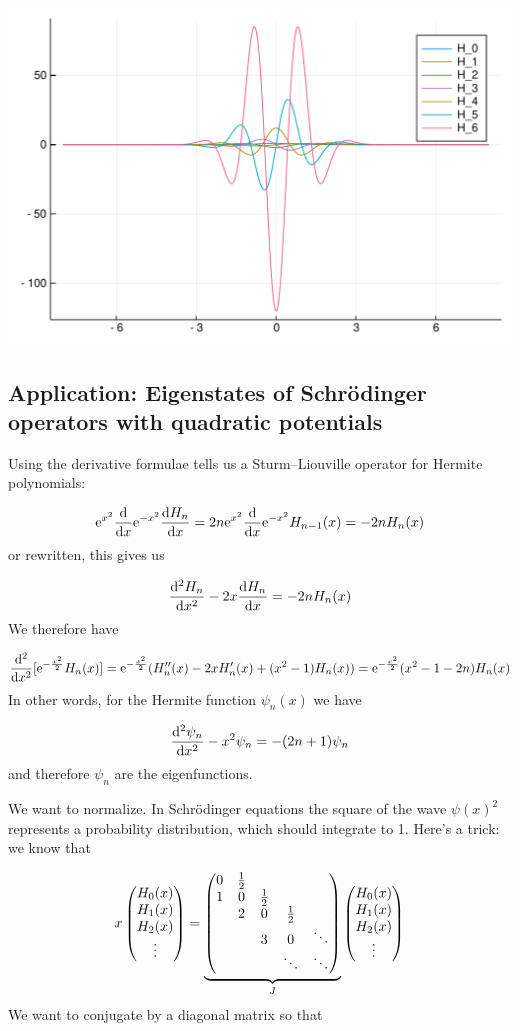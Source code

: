 \documentclass[12pt,a4paper]{article}
\def\half{ {1 \over 2} }
\def\D{ {\rm d} }
\def\E{ {\rm e} }
\def\dx{\D x}
\def\endash{–}
\begin{document}
\includegraphics[width=\linewidth]{figures/Lecture24_6_1.pdf}

\subsection{Application:  Eigenstates of Schrödinger operators with quadratic potentials}
Using the derivative formulae tells us a Sturm\ensuremath{\endash}Liouville operator for Hermite polynomials:

\[
\E^{x^2} {\D \over \dx} \E^{-x^2} {\D H_n \over \dx} = 2n \E^{x^2} {\D \over \dx} \E^{-x^2} H_{n-1}(x) = -2nH_n(x)
\]
or rewritten, this gives us

\[
{\D^2 H_n \over \dx^2} -2x {\D H_n \over \dx} = -2nH_n(x)
\]
We therefore have

\[
{\D^2 \over \dx^2}[\E^{-{x^2 \over 2}} H_n(x)] = \E^{-{x^2 \over 2}} (H_n''(x)  -2x H_n'(x) + (x^2-1) H_n(x)) = \E^{-{x^2 \over 2}} (x^2-1-2n) H_n(x)
\]
In other words, for the Hermite function $\psi_n(x)$ we have

\[
{\D^2 \psi_n \over \dx^2} -x^2 \psi_n = -(2n+1) \psi_n
\]
and therefore $\psi_n$ are the eigenfunctions.

We want to normalize.  In Schrödinger equations the square of the wave $\psi(x)^2$ represents a probability distribution, which should integrate to 1. Here's a trick: we know that 

\[
x \begin{pmatrix} H_0(x) \\ H_1(x) \\ H_2(x) \\ \vdots \end{pmatrix} = \underbrace{\begin{pmatrix} 0 & {1 \over 2} \\ 
1 & 0 & \half \\
& 2 & 0 & \half \\
&& 3 & 0 & \ddots \\
&&& \ddots & \ddots
\end{pmatrix}}_J\begin{pmatrix} H_0(x) \\ H_1(x) \\ H_2(x) \\ \vdots \end{pmatrix}
\]
We want to conjugate by a diagonal matrix so that
\end{document}
